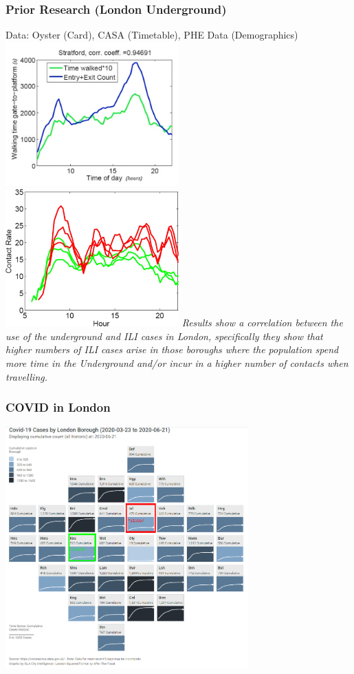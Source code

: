 \documentclass{beamer}
\begin{document}
\begin{frame}
\frametitle{Prior Research (London Underground)}
Data: Oyster (Card), CASA (Timetable), PHE Data (Demographics)\\
\includegraphics[width=0.5\textwidth]{Scratch_Visuals/London_Walking_time.png}%
\includegraphics[width=0.5\textwidth]{Scratch_Visuals/London_Borough_Comparison.png}
\textit{Results show a correlation between the use of the underground and ILI cases in London, specifically they show that higher numbers of ILI cases arise in those boroughs where the population spend more time in the Underground and/or incur in a higher number of contacts when travelling.}
 \cite{gosce_johansson_2018}
\end{frame}
\begin{frame}
\frametitle{COVID in London}
\includegraphics[width=0.7\textwidth]{Scratch_Visuals/London_Covid_Adapted.png}
\end{frame}
\end{document}
